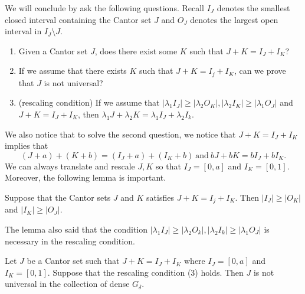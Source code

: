 
We will conclude by ask the following questions. Recall $I_J$ denotes the smallest closed interval containing the Cantor set $J$ and $O_J$ denotes  the largest open interval in $I_J\setminus J$. 


\begin{enumerate}
    \item Given a Cantor set $J$, does there exist some $K$ such that $J+K = I_J + I_K$?
    \item If we assume that there exists $K$ such that  $J +K = I_j + I_K$, can we prove that $J$ is not universal?
    \item (rescaling condition) If we assume that $|\lambda_1 I_J| \geq |\lambda_2 O_K|, |\lambda_2 I_K| \geq |\lambda_1 O_J|$ and  $J +K = I_J + I_K $, then $ \lambda_1 J + \lambda_2 K = \lambda_1 I_J + \lambda_2 I_k$.
\end{enumerate}

We also notice that to solve the second question, we notice that $J+K = I_J+I_K$ implies that 
$$
(J+a)+(K+b) = (I_J+a)+(I_K+b) \ \mbox{and} \  bJ+bK = bI_J+bI_K.
$$
We can always translate and rescale $J,K$ so that $I_J = [0,a]$ and $I_K = [0,1]$. Moreover, the following lemma is important. 

\begin{lemma}\label{lemma_gap}
Suppose that the Cantor sets $J$ and $K$ satisfies $J +K = I_j + I_K$. Then $|I_J| \ge |O_K|$ and $|I_K|\ge |O_J|$.
\end{lemma}

\medskip

The lemma also said that  the condition $|\lambda_1 I_J| \geq |\lambda_2O_k|, |\lambda_2 I_k| \geq |\lambda_1 O_J|$ is necessary in the rescaling  condition. 

\medskip

\begin{proposition}
Let $J$ be a Cantor set such that $J+K = I_J+I_K$ where $I_J = [0,a]$ and $I_K = [0,1]$. Suppose that the rescaling condition (3) holds. Then $J$ is not universal in the collection of dense $G_{\delta}$. 
\end{proposition}

